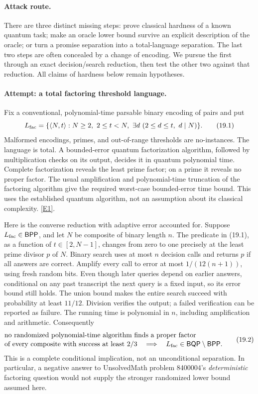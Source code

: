 \documentclass[11pt,a4paper]{article}
\newcommand{\eref}[2]{\hyperlink{extra:#1:#2}{[E#2]}}
\begin{document}
\paragraph{Attack route.}
There are three distinct missing steps: prove classical hardness of a known
quantum task; make an oracle lower bound survive an explicit description of
the oracle; or turn a promise separation into a total-language separation.
The last two steps are often concealed by a change of encoding. We pursue
the first through an exact decision/search reduction, then test the other
two against that reduction. All claims of hardness below remain hypotheses.

\paragraph{Attempt: a total factoring threshold language.}
Fix a conventional, polynomial-time parsable binary encoding of pairs and
put
\[
 L_{\rm fac}=\{\langle N,t\rangle:N\geq2,\ 2\leq t<N,
                  \ \exists d\ (2\leq d\leq t,\ d\mid N)\}.
 \tag{19.1}
\]
Malformed encodings, primes, and out-of-range thresholds are no-instances.
The language is total. A bounded-error quantum factorization algorithm,
followed by multiplication checks on its output, decides it in quantum
polynomial time. Complete factorization reveals the least prime factor;
on a prime it reveals no proper factor. The usual amplification and
polynomial-time truncation of the factoring algorithm give the required
worst-case bounded-error time bound. This uses the established quantum
algorithm, not an assumption about its classical complexity. \eref{30006683}{1}.

Here is the converse reduction with adaptive error accounted for. Suppose
$L_{\rm fac}\in\mathsf{BPP}$, and let $N$ be composite of binary length $n$.
The predicate in (19.1), as a function of $t\in[2,N-1]$, changes from zero
to one precisely at the least prime divisor $p$ of $N$. Binary search uses
at most $n$ decision calls and returns $p$ if all answers are correct.
Amplify every call to error at most $1/(12(n+1))$, using fresh random bits.
Even though later queries depend on earlier answers, conditional on any
past transcript the next query is a fixed input, so its error bound still
holds. The union bound makes the entire search succeed with probability
at least $11/12$. Division verifies the output; a failed verification can
be reported as failure. The running time is polynomial in $n$, including
amplification and arithmetic. Consequently
\[
 \begin{split}
 &\text{no randomized polynomial-time algorithm finds a proper factor}\\[-2pt]
 &\text{of every composite with success at least }2/3
 \quad\Longrightarrow\quad
 L_{\rm fac}\in\mathsf{BQP}\setminus\mathsf{BPP}.
 \end{split}
 \tag{19.2}
\]
This is a complete conditional implication, not an unconditional
separation. In particular, a negative answer to UnsolvedMath problem 8400004's
\emph{deterministic} factoring question would not supply the stronger
randomized lower bound assumed here.
\end{document}
